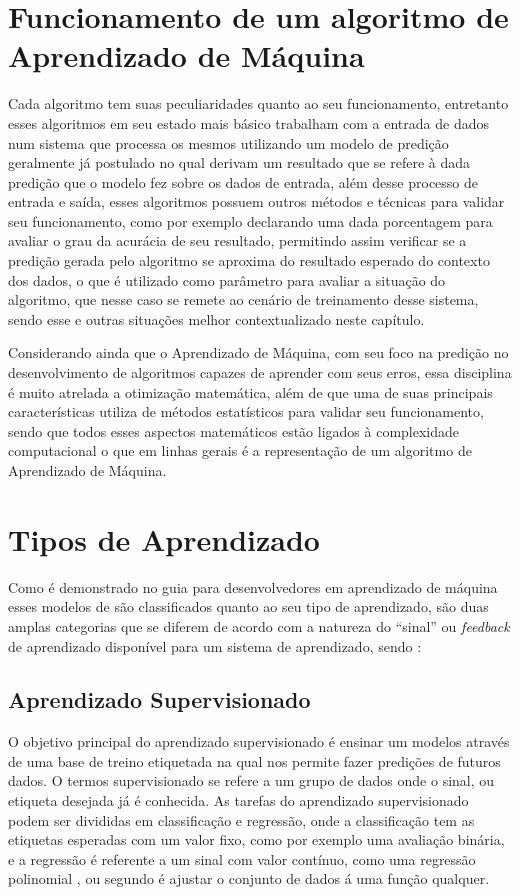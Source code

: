 \section{Funcionamento de um algoritmo de Aprendizado de Máquina}
Cada algoritmo tem suas peculiaridades quanto ao seu funcionamento, entretanto esses algoritmos em seu estado mais básico trabalham com a entrada de dados num sistema que processa os mesmos utilizando um modelo de predição geralmente já postulado no qual derivam um resultado que se refere à dada predição que o modelo fez sobre os dados de entrada, além desse processo de entrada e saída, esses algoritmos possuem outros métodos e técnicas para validar seu funcionamento, como por exemplo declarando uma dada porcentagem para avaliar o grau da acurácia de seu resultado, permitindo assim verificar se a predição gerada pelo algoritmo se aproxima do resultado esperado do contexto dos dados, o que é utilizado como parâmetro para avaliar a situação do algoritmo, que nesse caso se remete ao cenário de treinamento desse sistema, sendo esse e outras situações melhor contextualizado neste capítulo.

Considerando ainda que o Aprendizado de Máquina, com seu foco na predição no desenvolvimento de algoritmos capazes de aprender com seus erros, essa disciplina é muito atrelada a otimização matemática, além de que uma de suas principais características utiliza de métodos estatísticos para validar seu funcionamento, sendo que todos esses aspectos matemáticos estão ligados à complexidade computacional o que em linhas gerais é a representação de um algoritmo de Aprendizado de Máquina.

\section{Tipos de Aprendizado}
Como é demonstrado no guia para desenvolvedores em aprendizado de máquina esses modelos de são classificados quanto ao seu tipo de aprendizado, são duas amplas categorias que se diferem de acordo com a natureza do “sinal” ou \textit{feedback} de aprendizado disponível para um sistema de aprendizado, sendo \cite{geron2017hands}:
 
\subsection{Aprendizado Supervisionado}
O objetivo principal do aprendizado supervisionado é ensinar um modelos através de uma base de treino etiquetada na qual nos permite fazer predições de futuros dados. O termos supervisionado se refere a um grupo de dados onde o sinal, ou etiqueta desejada já é conhecida. As tarefas do aprendizado supervisionado podem ser divididas em classificação e regressão, onde a classificação tem as etiquetas esperadas com um valor fixo, como por exemplo uma avaliação binária, e a regressão é referente a um sinal com valor contínuo, como uma regressão polinomial \cite{geron2017hands}, ou segundo \cite{kirk2014thoughtful} é ajustar o conjunto de dados á uma função qualquer.

